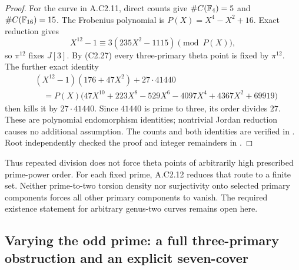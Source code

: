 \begin{proof}
For the curve in A.C2.11, direct counts give
$\#C(\mathbb F_4)=5$ and $\#C(\mathbb F_{16})=15$. The Frobenius
polynomial is $P(X)=X^4-X^2+16$. Exact reduction gives
\[
          X^{12}-1\equiv3(235X^2-1115)\pmod{P(X)},
\]
so $\pi^{12}$ fixes $J[3]$. By (C2.27) every three-primary
theta point is fixed by $\pi^{12}$. The further exact identity
\[
\begin{aligned}
 &(X^{12}-1)(176+47X^2)+27\cdot41440\\
 &\quad=P(X)\bigl(47X^{10}+223X^8-529X^6-4097X^4
                              +4367X^2+69919\bigr)
\end{aligned}                                                     \tag{C2.28}
\]
then kills it by $27\cdot41440$. Since $41440$ is prime to
three, its order divides $27$. These are polynomial
endomorphism identities; nontrivial Jordan reduction causes
no additional assumption. The counts and both identities are
verified in .
Root independently checked the proof and integer remainders
in .
\end{proof}

Thus repeated division does not force theta points of arbitrarily
high prescribed prime-power order. For each fixed prime, A.C2.12
reduces that route to a finite set. Neither prime-to-two torsion
density nor surjectivity onto selected primary components forces
all other primary components to vanish. The required existence
statement for arbitrary genus-two curves remains open here.

\subsection{Varying the odd prime: a full three-primary obstruction and an explicit seven-cover}

